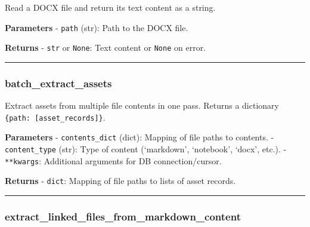 \begin{Shaded}
\begin{Highlighting}[]
\end{Highlighting}
\end{Shaded}

Read a DOCX file and return its text content as a string.

\textbf{Parameters} - \texttt{path} (str): Path to the DOCX file.

\textbf{Returns} - \texttt{str} or \texttt{None}: Text content or
\texttt{None} on error.

\begin{center}\rule{0.5\linewidth}{0.5pt}\end{center}

\subsubsection{batch\_extract\_assets}\label{batch_extract_assets}

\begin{Shaded}
\begin{Highlighting}[]
\OperatorTok{**}
\end{Highlighting}
\end{Shaded}

Extract assets from multiple file contents in one pass. Returns a
dictionary \texttt{\{path:\ {[}asset\_records{]}\}}.

\textbf{Parameters} - \texttt{contents\_dict} (dict): Mapping of file
paths to contents. - \texttt{content\_type} (str): Type of content
(`markdown', `notebook', `docx', etc.). - \texttt{**kwargs}: Additional
arguments for DB connection/cursor.

\textbf{Returns} - \texttt{dict}: Mapping of file paths to lists of
asset records.

\begin{center}\rule{0.5\linewidth}{0.5pt}\end{center}

\subsubsection{extract\_linked\_files\_from\_markdown\_content}\label{extract_linked_files_from_markdown_content}

\begin{Shaded}
\begin{Highlighting}[]
\OperatorTok{=}\NormalTok{)}
\end{Highlighting}
\end{Shaded}

